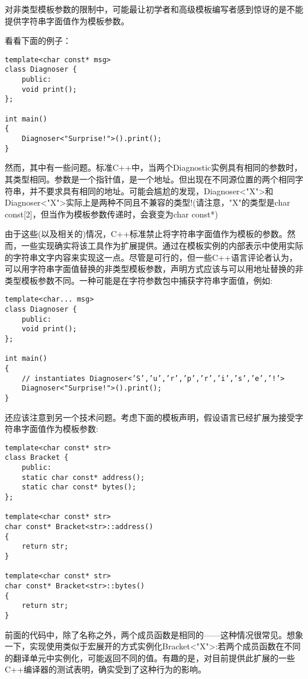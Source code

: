 对非类型模板参数的限制中，可能最让初学者和高级模板编写者感到惊讶的是不能提供字符串字面值作为模板参数。

看看下面的例子：

\begin{lstlisting}[style=styleCXX]
template<char const* msg>
class Diagnoser {
	public:
	void print();
};

int main()
{
	Diagnoser<"Surprise!">().print();
}
\end{lstlisting}

然而，其中有一些问题。标准C++中，当两个Diagnostic实例具有相同的参数时，其类型相同。参数是一个指针值，是一个地址。但出现在不同源位置的两个相同字符串，并不要求具有相同的地址。可能会尴尬的发现，Diagnoser<"X">和Diagnoser<"X">实际上是两种不同且不兼容的类型!(请注意，"X"的类型是char const[2]，但当作为模板参数传递时，会衰变为char const*)

由于这些(以及相关的)情况，C++标准禁止将字符串字面值作为模板的参数。然而，一些实现确实将该工具作为扩展提供。通过在模板实例的内部表示中使用实际的字符串文字内容来实现这一点。尽管是可行的，但一些C++语言评论者认为，可以用字符串字面值替换的非类型模板参数，声明方式应该与可以用地址替换的非类型模板参数不同。一种可能是在字符参数包中捕获字符串字面值，例如:

\begin{lstlisting}[style=styleCXX]
template<char... msg>
class Diagnoser {
	public:
	void print();
};

int main()
{
	// instantiates Diagnoser<’S’,’u’,’r’,’p’,’r’,’i’,’s’,’e’,’!’>
	Diagnoser<"Surprise!">().print();
}
\end{lstlisting}

还应该注意到另一个技术问题。考虑下面的模板声明，假设语言已经扩展为接受字符串字面值作为模板参数:

\begin{lstlisting}[style=styleCXX]
template<char const* str>
class Bracket {
	public:
	static char const* address();
	static char const* bytes();
};

template<char const* str>
char const* Bracket<str>::address()
{
	return str;
}

template<char const* str>
char const* Bracket<str>::bytes()
{
	return str;
}
\end{lstlisting}

前面的代码中，除了名称之外，两个成员函数是相同的——这种情况很常见。想象一下，实现使用类似于宏展开的方式实例化Bracket<"X">:若两个成员函数在不同的翻译单元中实例化，可能返回不同的值。有趣的是，对目前提供此扩展的一些C++编译器的测试表明，确实受到了这种行为的影响。


